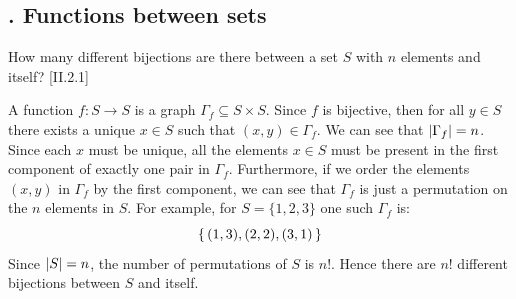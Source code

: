\subsection{. Functions between sets}

\begin{problem}[2.1]
How many different bijections are there between a set $S$ with $n$ elements
and itself? [\textsection II.2.1]
\end{problem}
\begin{solution}
	A function $f:S\to S$ is a graph $\Gamma_f\subseteq S\times S$. Since $f$ is
	bijective, then for all $y\in S$ there exists a unique $x\in S$ such that
	$(x,y)\in\Gamma_f$. We can see that $\left|\Gamma_f\right| = n$. Since each $x$ must be
	unique, all the elements $x\in S$ must be present in the first component of
	exactly one pair in $\Gamma_f$. Furthermore, if we order the elements $(x,y)$ in
	$\Gamma_f$ by the first component, we can see that $\Gamma_f$ is just a
	permutation on the $n$ elements in $S$. For example, for $S=\{1,2,3\}$ one such
	$\Gamma_f$ is:
	\[ \left\{\, (1,3), (2,2), (3,1) \,\right\} \]
	Since $\left|S\right| = n$, the number of permutations of $S$ is $n!$. Hence there are	$n!$ different bijections between $S$ and itself.
\end{solution}


